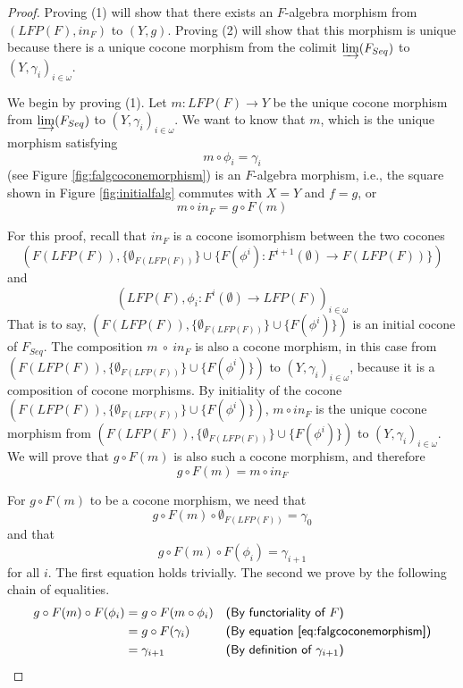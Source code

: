 \documentclass{msthesis}
\theoremstyle{definition}
\newcommand{\colim}{\varinjlim}
\begin{document}
\begin{proof}
    Proving (1) will show that there exists an $F$-algebra morphism from $(LFP(F), in_F)$ to $(Y, g)$.  Proving (2) will show that this morphism is unique because there is a unique cocone morphism from the colimit $\colim(F_{Seq})$ to $(Y, \gamma_i)_{i \in \omega}$.

    We begin by proving (1).  Let $m : LFP(F) \to Y$ be the unique cocone morphism from $\colim(F_{Seq})$ to $(Y, \gamma_i)_{i \in \omega}$.  We want to know that $m$, which is the unique morphism satisfying
    \begin{equation}\label{eq:falgcoconemorphism}
        m \circ \phi_i = \gamma_i
    \end{equation}
    (see Figure \ref{fig:falgcoconemorphism}) is an $F$-algebra morphism, i.e., the square shown in Figure \ref{fig:initialfalg} commutes with $X = Y$ and $f = g$, or
    \[ m \circ in_F = g \circ F(m) \]
    
    For this proof, recall that $in_F$ is a cocone isomorphism between the two cocones
    \[(F(LFP(F)), \{\emptyset_{F(LFP(F))}\} \cup \{ F(\phi^{i}) : F^{i+1}(\emptyset) \to F(LFP(F))\})\] and 
    \[(LFP(F), \phi_i : F^i(\emptyset) \to LFP(F))_{i \in \omega} \]
    That is to say, $(F(LFP(F)), \{\emptyset_{F(LFP(F))}\} \cup \{ F(\phi^{i})\})$ is an initial cocone of $F_{Seq}$. The composition $m~{\circ}~in_F$ is also a cocone morphism, in this case from $(F(LFP(F)), \{\emptyset_{F(LFP(F))}\} \cup \{ F(\phi^{i})\})$ to $(Y, \gamma_i)_{i \in \omega}$, because it is a composition of cocone morphisms.  By initiality of the cocone $(F(LFP(F)), \{\emptyset_{F(LFP(F))}\} \cup \{ F(\phi^{i})\})$, $m \circ in_F$ is the unique cocone morphism from $(F(LFP(F)), \{\emptyset_{F(LFP(F))}\} \cup \{ F(\phi^{i})\})$ to $(Y, \gamma_i)_{i \in \omega}$.  We will prove that $g \circ F(m)$
    is also such a cocone morphism, and therefore
    \[ g \circ F(m) = m \circ in_F \]

    For $g \circ F(m)$ to be a cocone morphism, we need that
    \[ g \circ F(m) \circ \emptyset_{F(LFP(F))} = \gamma_0 \]
    and that
    \[ g \circ F(m) \circ F(\phi_i) = \gamma_{i+1} \]
    for all $i$.  The first equation holds trivially.  The second we prove by the following chain of equalities.
    \begin{align*}
        g \circ F(m) \circ F(\phi_i) &= g \circ F(m \circ \phi_i) && \textsf{(By functoriality of $F$)} \\
        &= g \circ F(\gamma_i) && \textsf{(By equation \eqref{eq:falgcoconemorphism})} \\
        &= \gamma_{i+1} && \textsf{(By definition of $\gamma_{i+1}$)}
    \end{align*}


\end{proof}
\end{document}
